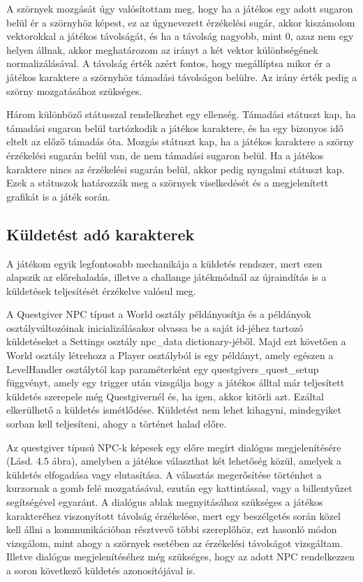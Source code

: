 A szörnyek mozgását úgy valósítottam meg, hogy ha a játékos egy adott sugaron belül ér a szörnyhöz képest, ez az úgynevezett érzékelési sugár, akkor kiszámolom vektorokkal a játékos távolságát, és ha a távolság nagyobb, mint 0, azaz nem egy helyen állnak, akkor meghatározom az irányt a két vektor különbségének normalizálásával. A távolság érték azért fontos, hogy megállíptsa mikor ér a játékos karaktere a szörnyhöz támadási távolságon belülre. Az irány érték pedig a szörny mozgatásához szükséges.

Három különböző státusszal rendelkezhet egy ellenség. Támadási státuszt kap, ha támadási sugaron belül tartózkodik a játékos karaktere, és ha egy bizonyos idő eltelt az előző támadás óta. Mozgás státuszt kap, ha a játékos karaktere a szörny érzékelési sugarán belül van, de nem támadási sugaron belül. Ha a játékos karaktere nincs az érzékelési sugarán belül, akkor pedig nyugalmi státuszt kap. Ezek a státuszok határozzák meg a szörnyek viselkedését és a megjelenített grafikát is a játék során.

\subsection{Küldetést adó karakterek}

\indent \indent A játékom egyik legfontosabb mechanikája a küldetés rendszer, mert ezen alapszik az előrehaladás, illetve a challange játékmódnál az újraindítás is a küldetések teljesítését érzékelve valósul meg. 

A Questgiver NPC típust a World osztály példányosítja és a példányok osztályváltozóinak inicializálásakor olvassa be a saját id-jéhez tartozó küldetéseket a Settings osztály npc\_data dictionary-jéből. Majd ezt követően a World osztály létrehozz a Player osztályból is egy példányt, amely egészen a LevelHandler osztálytól kap paraméterként egy questgivers\_quest\_setup függvényt, amely egy trigger után vizsgálja hogy a játékos álltal már teljesített küldetés szerepel\-e még Questgivernél és, ha igen, akkor kitörli azt. Ezáltal elkerülhető a küldetés ismétlődése. Küldetést nem lehet kihagyni, mindegyiket sorban kell teljesíteni, ahogy a történet halad előre.

Az questgiver típusú NPC-k képesek egy előre megírt dialógus megjelenítésére (Lásd. 4.5 ábra), amelyben a játékos választhat két lehetőség közül, amelyek a küldetés elfogadása vagy elutasítása. A választás megerősítése történhet a kurzornak a gomb felé mozgatásával, ezután egy kattintással, vagy a billentyűzet segítségével egyaránt. A dialógus ablak megnyitásához szükséges a játékos karakteréhez viszonyított távolság érzékelése, mert egy beszélgetés során közel kell állni a kommunikációban résztvevő többi szereplőhöz, ezt hasonló módon vizsgálom, mint ahogy a szörnyek esetében az érzékelési távolságot vizsgáltam. Illetve dialógus megjelenítéséhez még szükséges, hogy az adott NPC rendelkezzen a soron következő küldetés azonosítójával is.   

